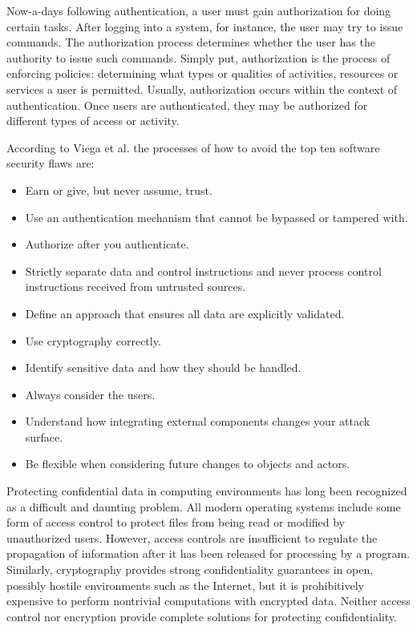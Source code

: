 Now-a-days following authentication, a user must gain authorization for doing certain tasks. After logging into a system, for instance, the user may try to issue commands. The authorization process determines whether the user has the authority to issue such commands. Simply put, authorization is the process of enforcing policies: determining what types or qualities of activities, resources or services a user is permitted. Usually, authorization occurs within the context of authentication. Once users are authenticated, they may be authorized for different types of access or activity.

According to Viega et al. \cite{ref_92_viega2001building} the processes of how to avoid the top ten software security flaws are:
\begin{itemize}
	\item Earn or give, but never assume, trust.
	
	\item Use an authentication mechanism that
	cannot be bypassed or tampered with.
	
	\item Authorize after you authenticate.
	
	\item Strictly separate data and control
	instructions and never process control
	instructions received from untrusted sources.
	
	\item Define an approach that ensures all data are
	explicitly validated.

	\item Use cryptography correctly.
	 
	\item Identify sensitive data and how they should
	be handled.
	
	\item Always consider the users.

	\item Understand how integrating external
	components changes your attack surface.
	
	\item Be flexible when considering future changes
	to objects and actors.
	
	
\end{itemize}

Protecting confidential data in computing environments has long been recognized as a difficult and daunting problem. All modern operating systems include some form of access control to protect files from being read or modified by unauthorized users. However, access controls are insufficient to regulate the propagation of information after it has been released for processing by a program. Similarly,
cryptography provides strong confidentiality guarantees in open, possibly hostile environments such as the Internet, but it is prohibitively expensive to perform nontrivial computations with encrypted data. Neither access control nor encryption
provide complete solutions for protecting confidentiality.

